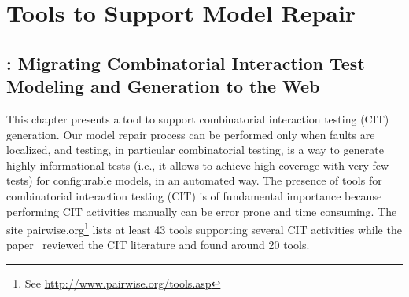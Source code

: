 \begin{tikzborder}{\cite{Gargantini16:validation}}
\begin{tikzborder}{\cite{gargantini_combinatorial_2017}}
\begin{tikzborder}{\cite{gargantini_combinatorial_2017}}
\begin{tikzborder}{\cite{garn2019}}
\begin{tikzborder}{\cite{arcaini2019achieving}}

\part{Tools to Support Model Repair}
\chapter{\ctwedge: Migrating Combinatorial Interaction Test Modeling and Generation to the Web}\label{ch:ctwedge}
This chapter presents a tool to support combinatorial interaction testing (CIT) generation. Our model repair process can be performed only when faults are localized, and testing, in particular combinatorial testing, is a way to generate highly informational tests (i.e., it allows to achieve high coverage with very few tests) for configurable models, in an automated way.
The presence of tools for combinatorial interaction testing (CIT) is of fundamental importance because performing CIT activities manually can be error prone and time consuming. 
The site pairwise.org\footnote{See \url{http://www.pairwise.org/tools.asp}} lists at least 43 tools supporting several CIT activities while the paper~\cite{NieL11} reviewed the CIT literature and found around 20 tools. 


\end{tikzborder}
\end{tikzborder}
\end{tikzborder}
\end{tikzborder}
\end{tikzborder}
